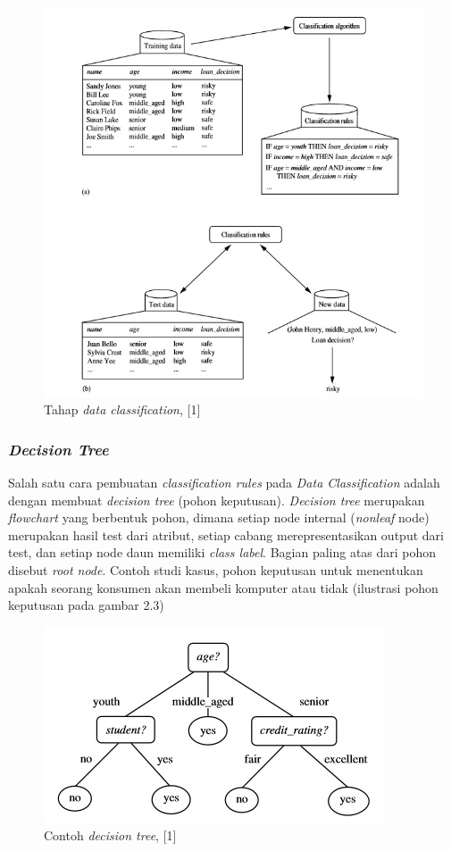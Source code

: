 \begin{figure}
\includegraphics[scale=1]{Gambar/tahapdataclassification.jpg}
\caption[Tahap \textsl{data classification}]{Tahap \textsl{data classification}, [1]} 
\end{figure}

\subsubsection{\textsl{Decision Tree}}
Salah satu cara pembuatan \textsl{classification rules} pada \textsl{Data Classification} adalah dengan membuat \textsl{decision tree} (pohon keputusan). \textsl{Decision tree} merupakan \textsl{flowchart} yang berbentuk pohon, dimana setiap node internal (\textsl{nonleaf} node) merupakan hasil test dari atribut, setiap cabang merepresentasikan output dari test, dan setiap node daun memiliki \textsl{class label}. Bagian paling atas dari pohon disebut \textsl{root node}. Contoh studi kasus, pohon keputusan untuk menentukan apakah seorang konsumen akan membeli komputer atau tidak (ilustrasi pohon keputusan pada gambar 2.3) 

\begin{figure}
\includegraphics[scale=1]{Gambar/decisiontree.jpg}
\caption[Contoh \textsl{decision tree}]{Contoh \textsl{decision tree}, [1]} 
\end{figure}


